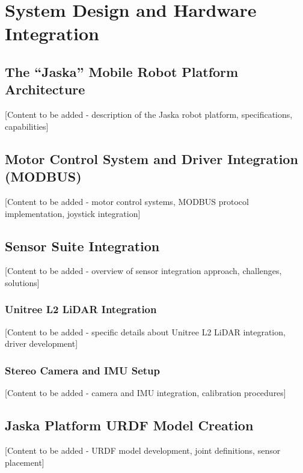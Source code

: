 \vspace{21.5pt}
\chapter{System Design and Hardware Integration}

\section{The ``Jaska'' Mobile Robot Platform Architecture}

[Content to be added - description of the Jaska robot platform, specifications, capabilities]

\section{Motor Control System and Driver Integration (MODBUS)}

[Content to be added - motor control systems, MODBUS protocol implementation, joystick integration]

\section{Sensor Suite Integration}

[Content to be added - overview of sensor integration approach, challenges, solutions]

\subsection{Unitree L2 LiDAR Integration}

[Content to be added - specific details about Unitree L2 LiDAR integration, driver development]

\subsection{Stereo Camera and IMU Setup}

[Content to be added - camera and IMU integration, calibration procedures]

\section{Jaska Platform URDF Model Creation}

[Content to be added - URDF model development, joint definitions, sensor placement]

